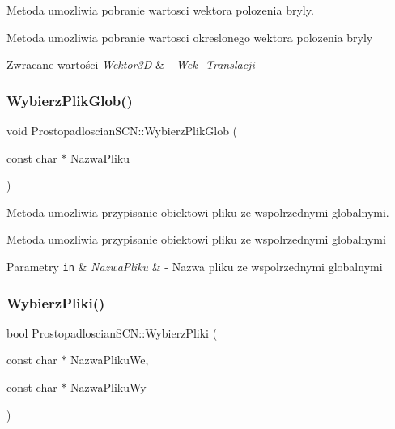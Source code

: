 Metoda umozliwia pobranie wartosci wektora polozenia bryly. 

Metoda umozliwia pobranie wartosci okreslonego wektora polozenia bryly 
\begin{DoxyRetVals}{Zwracane wartości}
{\em Wektor3D} & {\itshape \+\_\+\+Wek\+\_\+\+Translacji} \\
\hline
\end{DoxyRetVals}
\mbox{\label{classProstopadloscianSCN_aedacd1e8362390241287296f5107d493}} 
\subsubsection{\texorpdfstring{Wybierz\+Plik\+Glob()}{WybierzPlikGlob()}}
{\footnotesize\ttfamily void Prostopadloscian\+S\+C\+N\+::\+Wybierz\+Plik\+Glob (\begin{DoxyParamCaption}\item[{const char $\ast$}]{Nazwa\+Pliku }\end{DoxyParamCaption})\hspace{0.3cm}{\ttfamily [inline]}}



Metoda umozliwia przypisanie obiektowi pliku ze wspolrzednymi globalnymi. 

Metoda umozliwia przypisanie obiektowi pliku ze wspolrzednymi globalnymi


\begin{DoxyParams}[1]{Parametry}
\mbox{\tt in}  & {\em Nazwa\+Pliku} & -\/ Nazwa pliku ze wspolrzednymi globalnymi \\
\hline
\end{DoxyParams}
\mbox{\label{classProstopadloscianSCN_a397c310956e20068dc3588ee4d4a9c87}} 
\subsubsection{\texorpdfstring{Wybierz\+Pliki()}{WybierzPliki()}}
{\footnotesize\ttfamily bool Prostopadloscian\+S\+C\+N\+::\+Wybierz\+Pliki (\begin{DoxyParamCaption}\item[{const char $\ast$}]{Nazwa\+Pliku\+We,  }\item[{const char $\ast$}]{Nazwa\+Pliku\+Wy }\end{DoxyParamCaption})}



